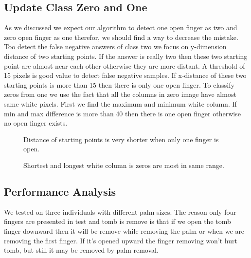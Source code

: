 \subsection{Update Class Zero and One}
As we discussed we expect our algorithm to detect one open finger as two and zero open finger as one therefor, we should find a way to decrease the mistake. Too detect the false negative answers of class two we focus on y-dimension distance of two starting points. If the answer is really two then these two starting point are almost near each other otherwise they are more distant. A threshold of 15 pixels is good value to detect false negative samples. If x-distance of these two starting points is more than 15 then there is only one open finger. \newline
To classify zeros from one we use the fact that all the columns in zero image have almost same white pixels. First we find the maximum and minimum white column. If min and max difference is more than 40 then there is one open finger otherwise no open finger exists.
\begin{figure}
\caption{Distance of starting points is very shorter when only one finger is open.}
\end{figure}
\begin{figure}
\caption{Shortest and longest white column is zeros are most in same range.}
\end{figure}


\subsection{Performance Analysis}
We tested on three individuals with different palm sizes. \newline
{}
The reason only four fingers are presented in test and tomb is remove is that if we open the tomb finger downward then it will be remove while removing the palm or when we are removing the first finger. If it's opened upward the finger removing won't hurt tomb, but still it may be removed by palm removal.

